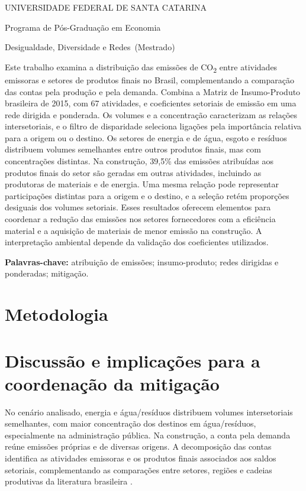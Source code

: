 \documentclass[11pt]{article}
\renewenvironment{abstract}{\par\medskip\noindent\textbf{\abstractname}\par\smallskip\small\setstretch{1}\noindent}{\par\medskip}
\newcommand{\instituicao}{UNIVERSIDADE FEDERAL DE SANTA CATARINA}
\newcommand{\departamento}{Programa de Pós-Graduação em Economia}
\newcommand{\curso}{Mestrado}
\newcommand{\disciplina}{Desigualdade, Diversidade e Redes}
\newcommand{\titulo}{Rede de emissões de CO\textsubscript{2} no Brasil}
\newcommand{\autor}{Gabriel Pincelli Cintra}
\newcommand{\local}{Florianópolis}
\newcommand{\dataentrega}{18 de outubro de 2026}
\newcommand{\imprimirtitulodois}{
\begin{center}
  {\small\MakeUppercase{\instituicao}\par}
  {\small \departamento\par}
  {\small \disciplina\ (\curso)\par}
  \vspace{1em}{\LARGE\bfseries \titulo\par}
  \vspace{0.7em}{\normalsize \autor\par}
  \vspace{0.3em}{\small \local, \dataentrega\par}
\end{center}
\vspace{0.4em}}
\begin{document}
\imprimirtitulodois
\thispagestyle{empty}
\begin{abstract}
Este trabalho examina a distribuição das emissões de CO\textsubscript{2} entre atividades emissoras e setores de produtos finais no Brasil, complementando a comparação das contas pela produção e pela demanda. Combina a Matriz de Insumo-Produto brasileira de 2015, com 67 atividades, e coeficientes setoriais de emissão em uma rede dirigida e ponderada. Os volumes e a concentração caracterizam as relações intersetoriais, e o filtro de disparidade seleciona ligações pela importância relativa para a origem ou o destino. Os setores de energia e de água, esgoto e resíduos distribuem volumes semelhantes entre outros produtos finais, mas com concentrações distintas. Na construção, 39,5\% das emissões atribuídas aos produtos finais do setor são geradas em outras atividades, incluindo as produtoras de materiais e de energia. Uma mesma relação pode representar participações distintas para a origem e o destino, e a seleção retém proporções desiguais dos volumes setoriais. Esses resultados oferecem elementos para coordenar a redução das emissões nos setores fornecedores com a eficiência material e a aquisição de materiais de menor emissão na construção. A interpretação ambiental depende da validação dos coeficientes utilizados.
\end{abstract}
\noindent\textbf{Palavras-chave:} atribuição de emissões; insumo-produto; redes dirigidas e ponderadas; mitigação.

\clearpage

\clearpage
\section{Metodologia}



\clearpage

\clearpage
\section{Discussão e implicações para a coordenação da mitigação}

No cenário analisado, energia e água/resíduos distribuem volumes intersetoriais semelhantes, com maior concentração dos destinos em água/resíduos, especialmente na administração pública. Na construção, a conta pela demanda reúne emissões próprias e de diversas origens. A decomposição das contas identifica as atividades emissoras e os produtos finais associados aos saldos setoriais, complementando as comparações entre setores, regiões e cadeias produtivas da literatura brasileira \parencite{imori2015,sanguinetAzzoni2024,montoyaEtAl2026}.
\end{document}
